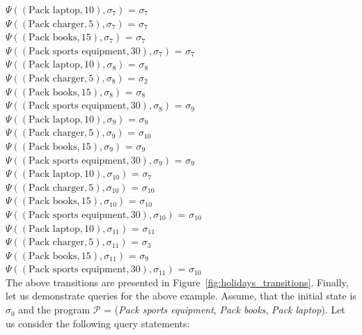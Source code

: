\documentclass[a4paper]{article}
\begin{document}
$\Psi((\text{Pack laptop},10),\sigma_7)$ = $\sigma_7$ \\[0.1\baselineskip] 
$\Psi((\text{Pack charger},5),\sigma_7)$ = $\sigma_7$ \\[0.1\baselineskip] 
$\Psi((\text{Pack books},15),\sigma_7)$ = $\sigma_7$ \\[0.1\baselineskip] 
$\Psi((\text{Pack sports equipment},30),\sigma_7)$ = $\sigma_7$ \\[0.7\baselineskip]
$\Psi((\text{Pack laptop},10),\sigma_8)$ = $\sigma_8$ \\[0.1\baselineskip] 
$\Psi((\text{Pack charger},5),\sigma_8)$ = $\sigma_2$ \\[0.1\baselineskip] 
$\Psi((\text{Pack books},15),\sigma_8)$ = $\sigma_8$ \\[0.1\baselineskip] 
$\Psi((\text{Pack sports equipment},30),\sigma_8)$ = $\sigma_9$ \\[0.7\baselineskip]
$\Psi((\text{Pack laptop},10),\sigma_9)$ = $\sigma_9$ \\[0.1\baselineskip] 
$\Psi((\text{Pack charger},5),\sigma_9)$ = $\sigma_{10}$ \\[0.1\baselineskip] 
$\Psi((\text{Pack books},15),\sigma_9)$ = $\sigma_9$ \\[0.1\baselineskip] 
$\Psi((\text{Pack sports equipment},30),\sigma_9)$ = $\sigma_9$ \\[0.7\baselineskip]
$\Psi((\text{Pack laptop},10),\sigma_{10})$ = $\sigma_7$ \\[0.1\baselineskip] 
$\Psi((\text{Pack charger},5),\sigma_{10})$ = $\sigma_{10}$ \\[0.1\baselineskip] 
$\Psi((\text{Pack books},15),\sigma_{10})$ = $\sigma_{10}$ \\[0.1\baselineskip] 
$\Psi((\text{Pack sports equipment},30),\sigma_{10})$ = $\sigma_{10}$ \\[0.7\baselineskip]
$\Psi((\text{Pack laptop},10),\sigma_{11})$ = $\sigma_{11}$ \\[0.1\baselineskip] 
$\Psi((\text{Pack charger},5),\sigma_{11})$ = $\sigma_3$ \\[0.1\baselineskip] 
$\Psi((\text{Pack books},15),\sigma_{11})$ = $\sigma_9$ \\[0.1\baselineskip] 
$\Psi((\text{Pack sports equipment},30),\sigma_{11})$ = $\sigma_{10}$ \\[0.7\baselineskip]
The above transitions are presented in Figure~\ref{fig:holidays_transitions}.
Finally, let us demonstrate queries for the above example. Assume, that the initial state is $\sigma_0$ and the program $\mathcal{P}$ = (\textit{Pack sports equipment}, \textit{Pack books}, \textit{Pack laptop}). Let us consider the following query statements:
\end{document}
